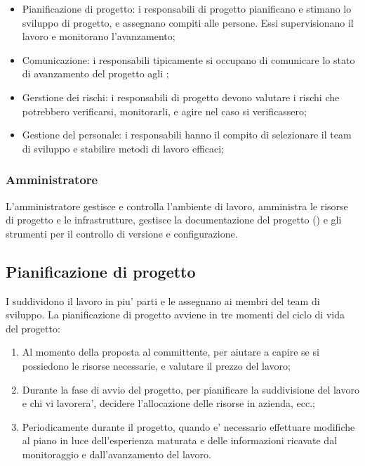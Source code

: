\begin{itemize}
  \item Pianificazione di progetto: i responsabili di progetto pianificano e
    stimano lo sviluppo di progetto, e assegnano compiti alle persone. Essi
    supervisionano il lavoro e monitorano l'avanzamento;
  \item Comunicazione: i responsabili tipicamente si occupano di comunicare lo
    stato di avanzamento del progetto agli ;
  \item Gerstione dei rischi: i responsabili di progetto devono valutare i
    rischi che potrebbero verificarsi, monitorarli, e agire nel caso si
    verificassero;
  \item Gestione del personale: i responsabili hanno il compito di selezionare
    il team di sviluppo e stabilire metodi di lavoro efficaci;
\end{itemize}

\subsubsection{Amministratore}

L'amministratore gestisce e controlla l'ambiente di lavoro, amministra le
risorse di progetto e le infrastrutture, gestisce la documentazione del progetto
() e gli strumenti per il controllo di versione e
configurazione.

\subsection{Pianificazione di progetto}

I  suddividono il lavoro in piu' parti e le assegnano
ai membri del team di sviluppo. La pianificazione di progetto avviene in tre
momenti del ciclo di vida del progetto:

\begin{enumerate}
  \item Al momento della proposta al committente, per aiutare a capire se si
    possiedono le risorse necessarie, e valutare il prezzo del lavoro;
  \item Durante la fase di avvio del progetto, per pianificare la suddivisione
    del lavoro e chi vi lavorera', decidere l'allocazione delle risorse in
    azienda, ecc.;
  \item Periodicamente durante il progetto, quando e' necessario effettuare
    modifiche al piano in luce dell'esperienza maturata e delle informazioni
    ricavate dal monitoraggio e dall'avanzamento del lavoro.
\end{enumerate}

